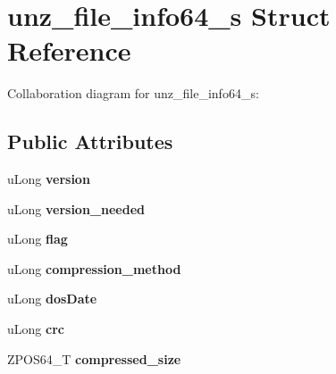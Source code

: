\hypertarget{structunz__file__info64__s}{\section{unz\+\_\+file\+\_\+info64\+\_\+s Struct Reference}
\label{structunz__file__info64__s}
}


Collaboration diagram for unz\+\_\+file\+\_\+info64\+\_\+s\+:
\subsection*{Public Attributes}
\begin{DoxyCompactItemize}
\item 
\hypertarget{structunz__file__info64__s_a4262e51be02716b887447e68c231006b}{u\+Long {\bfseries version}}\label{structunz__file__info64__s_a4262e51be02716b887447e68c231006b}

\item 
\hypertarget{structunz__file__info64__s_ad0041eacba37cb431242d9bd9c86d264}{u\+Long {\bfseries version\+\_\+needed}}\label{structunz__file__info64__s_ad0041eacba37cb431242d9bd9c86d264}

\item 
\hypertarget{structunz__file__info64__s_a9432647db394dbfd2a415d6c1184db92}{u\+Long {\bfseries flag}}\label{structunz__file__info64__s_a9432647db394dbfd2a415d6c1184db92}

\item 
\hypertarget{structunz__file__info64__s_ac25e6f99bc51d046b8871ddbb4b5f9f7}{u\+Long {\bfseries compression\+\_\+method}}\label{structunz__file__info64__s_ac25e6f99bc51d046b8871ddbb4b5f9f7}

\item 
\hypertarget{structunz__file__info64__s_a96e084f75d7f08f546789a0a4525470f}{u\+Long {\bfseries dos\+Date}}\label{structunz__file__info64__s_a96e084f75d7f08f546789a0a4525470f}

\item 
\hypertarget{structunz__file__info64__s_a3026bf850e727543d9304c8deaf9eb27}{u\+Long {\bfseries crc}}\label{structunz__file__info64__s_a3026bf850e727543d9304c8deaf9eb27}

\item 
\hypertarget{structunz__file__info64__s_afefa321d4008a52a609d437ed4b4e03f}{Z\+P\+O\+S64\+\_\+\+T {\bfseries compressed\+\_\+size}}\label{structunz__file__info64__s_afefa321d4008a52a609d437ed4b4e03f}


\end{DoxyCompactItemize}
